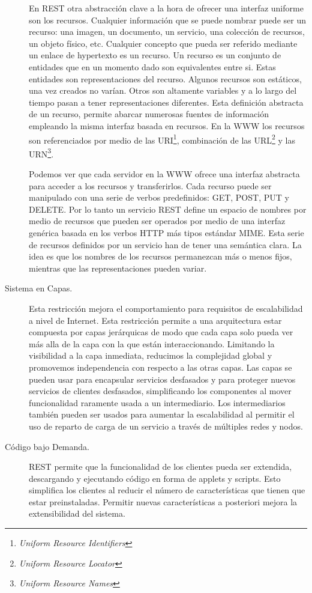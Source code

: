 \begin{description}
  En REST otra abstracción clave a la hora de ofrecer una interfaz
  uniforme son los recursos. Cualquier información que se puede
  nombrar puede ser un recurso: una imagen, un documento, un servicio,
  una colección de recursos, un objeto físico, etc. Cualquier concepto
  que pueda ser referido mediante un enlace de hypertexto es un
  recurso. Un recurso es un conjunto de entidades que en un momento
  dado son equivalentes entre si. Estas entidades son representaciones
  del recurso. Algunos recursos son estáticos, una vez creados no
  varían. Otros son altamente variables y a lo largo del tiempo pasan
  a tener representaciones diferentes. Esta definición abstracta de un
  recurso, permite abarcar numerosas fuentes de información empleando
  la misma interfaz basada en recursos. En la WWW los recursos son
  referenciados por medio de las URI\footnote{\emph{Uniform Resource
      Identifiers}}, combinación de las URL\footnote{\emph{Uniform
      Resource Locator}} y las URN\footnote{\emph{Uniform Resource
      Names}}.

  Podemos ver que cada servidor en la WWW ofrece una interfaz
  abstracta para acceder a los recursos y transferirlos. Cada recurso
  puede ser manipulado con una serie de verbos predefinidos: GET,
  POST, PUT y DELETE. Por lo tanto un servicio REST define un espacio
  de nombres por medio de recursos que pueden ser operados por medio
  de una interfaz genérica basada en los verbos HTTP más tipos
  estándar MIME. Esta serie de recursos definidos por un servicio han
  de tener una semántica clara. La idea es que los nombres de los
  recursos permanezcan más o menos fijos, mientras que las
  representaciones pueden variar.

\item[Sistema en Capas.] Esta restricción mejora el comportamiento para
  requisitos de escalabilidad a nivel de Internet. Esta restricción
  permite a una arquitectura estar compuesta por capas jerárquicas de
  modo que cada capa solo pueda ver más alla de la capa con la que
  están interaccionando. Limitando la visibilidad a la capa inmediata,
  reducimos la complejidad global y promovemos independencia con
  respecto a las otras capas. Las capas se pueden usar para encapsular
  servicios desfasados y para proteger nuevos servicios de clientes
  desfasados, simplificando los componentes al mover funcionalidad
  raramente usada a un intermediario. Los intermediarios también
  pueden ser usados para aumentar la escalabilidad al permitir el uso
  de reparto de carga de un servicio a través de múltiples redes y
  nodos.

\item[Código bajo Demanda.] REST permite que la funcionalidad de los
  clientes pueda ser extendida, descargando y ejecutando código en
  forma de applets y scripts. Esto simplifica los clientes al reducir
  el número de características que tienen que estar
  preinstaladas. Permitir nuevas características a posteriori mejora
  la extensibilidad del sistema.
\end{description}

